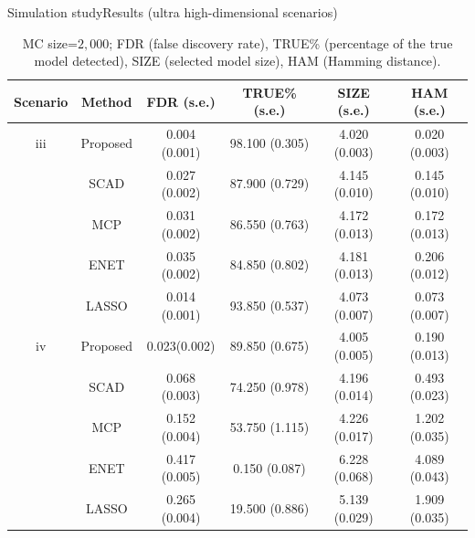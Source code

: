 \documentclass[citecolor=blue,10pt]{beamer}
\newcommand{\0} {\mbox{\boldmath$0$}}
\begin{document}
\begin{frame}{Simulation study}{Results (ultra high-dimensional scenarios)}
{\footnotesize
\begin{table}[H]
 \centering 
 \caption{MC size=$2,000$; FDR (false discovery rate), TRUE\% (percentage of the true model detected), SIZE (selected model size), HAM (Hamming distance).}\label{T:sim2}
 \begin{tabular}{cc|c|c|c|c}
  \hline
  Scenario & Method                         & FDR  (s.e.)    & TRUE\% (s.e.)   & SIZE (s.e.)     & HAM (s.e.)    \\
  \hline
   iii        & Proposed & 0.004 (0.001)   & 98.100 (0.305)  & 4.020 (0.003)    & 0.020 (0.003) \\
           & SCAD                           & 0.027 (0.002)  & 87.900 (0.729)  & 4.145 (0.010)   & 0.145 (0.010) \\
           & MCP                            & 0.031 (0.002)  & 86.550 (0.763)  & 4.172 (0.013)   & 0.172 (0.013) \\
           & ENET                           & 0.035 (0.002)  & 84.850 (0.802)  & 4.181 (0.013)   & 0.206 (0.012) \\
           & LASSO                          & 0.014 (0.001)  & 93.850 (0.537)  & 4.073 (0.007)   & 0.073 (0.007) \\
  \hline
    iv       & Proposed & 0.023(0.002)   & 89.850 (0.675)  & 4.005 (0.005) & 0.190 (0.013) \\
           & SCAD                           & 0.068 (0.003)  & 74.250 (0.978)  & 4.196 (0.014)   & 0.493 (0.023) \\
           & MCP                            & 0.152 (0.004)  & 53.750 (1.115)  & 4.226 (0.017)   & 1.202 (0.035) \\
           & ENET                           & 0.417 (0.005)  & 0.150 (0.087)   & 6.228 (0.068)   & 4.089 (0.043) \\
           & LASSO                          & 0.265 (0.004)  & 19.500 (0.886)  & 5.139 (0.029)   & 1.909 (0.035) \\
  \hline
 \end{tabular}
\end{table}}
\end{frame}
\end{document}
